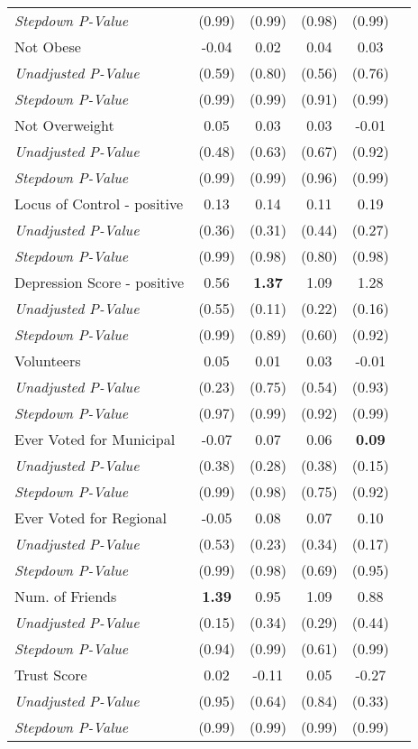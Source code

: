 \begin{tabular}{l c c c c c}
\quad \textit{Stepdown P-Value} & (0.99) & (0.99) & (0.98) & (0.99) \\
Not Obese & -0.04 & 0.02 & 0.04 & 0.03 \\
\quad \textit{Unadjusted P-Value} & (0.59) & (0.80) & (0.56) & (0.76) \\
\quad \textit{Stepdown P-Value} & (0.99) & (0.99) & (0.91) & (0.99) \\
Not Overweight & 0.05 & 0.03 & 0.03 & -0.01 \\
\quad \textit{Unadjusted P-Value} & (0.48) & (0.63) & (0.67) & (0.92) \\
\quad \textit{Stepdown P-Value} & (0.99) & (0.99) & (0.96) & (0.99) \\
Locus of Control - positive & 0.13 & 0.14 & 0.11 & 0.19 \\
\quad \textit{Unadjusted P-Value} & (0.36) & (0.31) & (0.44) & (0.27) \\
\quad \textit{Stepdown P-Value} & (0.99) & (0.98) & (0.80) & (0.98) \\
Depression Score - positive & 0.56 & \textbf{ 1.37 } & 1.09 & 1.28 \\
\quad \textit{Unadjusted P-Value} & (0.55) & (0.11) & (0.22) & (0.16) \\
\quad \textit{Stepdown P-Value} & (0.99) & (0.89) & (0.60) & (0.92) \\
Volunteers & 0.05 & 0.01 & 0.03 & -0.01 \\
\quad \textit{Unadjusted P-Value} & (0.23) & (0.75) & (0.54) & (0.93) \\
\quad \textit{Stepdown P-Value} & (0.97) & (0.99) & (0.92) & (0.99) \\
Ever Voted for Municipal & -0.07 & 0.07 & 0.06 & \textbf{ 0.09 } \\
\quad \textit{Unadjusted P-Value} & (0.38) & (0.28) & (0.38) & (0.15) \\
\quad \textit{Stepdown P-Value} & (0.99) & (0.98) & (0.75) & (0.92) \\
Ever Voted for Regional & -0.05 & 0.08 & 0.07 & 0.10 \\
\quad \textit{Unadjusted P-Value} & (0.53) & (0.23) & (0.34) & (0.17) \\
\quad \textit{Stepdown P-Value} & (0.99) & (0.98) & (0.69) & (0.95) \\
Num. of Friends & \textbf{ 1.39 } & 0.95 & 1.09 & 0.88 \\
\quad \textit{Unadjusted P-Value} & (0.15) & (0.34) & (0.29) & (0.44) \\
\quad \textit{Stepdown P-Value} & (0.94) & (0.99) & (0.61) & (0.99) \\
Trust Score & 0.02 & -0.11 & 0.05 & -0.27 \\
\quad \textit{Unadjusted P-Value} & (0.95) & (0.64) & (0.84) & (0.33) \\
\quad \textit{Stepdown P-Value} & (0.99) & (0.99) & (0.99) & (0.99) \\
\bottomrule
\end{tabular}
